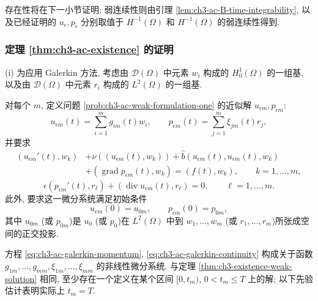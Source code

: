 存在性将在下一小节证明; 弱连续性则由引理 \ref{lem:ch3-ac-B-time-integrability}, 以及已经证明的 $u_\epsilon,p_\epsilon$ 分别取值于 $H^{-1}(\Omega)$ 和 $H^{-1}(\Omega)$ 的弱连续性得到.

\subsubsection{定理 \ref{thm:ch3-ac-existence} 的证明}
\label{subsubsec:ch3-ac-existence-proof}

\begin{Proof}
(i) 为应用 Galerkin 方法, 考虑由 $\mathcal D(\Omega)$ 中元素 $w_i$ 构成的 $H_0^1(\Omega)$ 的一组基, 以及由 $\mathcal D(\Omega)$ 中元素 $r_i$ 构成的 $L^2(\Omega)$ 的一组基.

对每个 $m$, 定义问题 \ref{prob:ch3-ac-weak-formulation-one} 的近似解 $u_{\epsilon m},p_{\epsilon m}$:
\begin{equation}
u_{\epsilon m}(t)=\sum_{i=1}^m g_{im}(t)w_i,
\qquad
p_{\epsilon m}(t)=\sum_{j=1}^m\xi_{jm}(t)r_j,
\label{eq:ch3-ac-galerkin-expansion}
\end{equation}
并要求
\begin{equation}
\begin{aligned}
(u_{\epsilon m}'(t),w_k)&+\nu((u_{\epsilon m}(t),w_k))
+\widehat b(u_{\epsilon m}(t),u_{\epsilon m}(t),w_k)\\
&+(\operatorname{grad}p_{\epsilon m}(t),w_k)
=(f(t),w_k),
\qquad k=1,\ldots,m,
\end{aligned}
\label{eq:ch3-ac-galerkin-momentum}
\end{equation}
\begin{equation}
\epsilon(p_{\epsilon m}'(t),r_\ell)
+(\operatorname{div}u_{\epsilon m}(t),r_\ell)=0,
\qquad \ell=1,\ldots,m.
\label{eq:ch3-ac-galerkin-continuity}
\end{equation}
此外, 要求这一微分系统满足初始条件
\begin{equation}
u_{\epsilon m}(0)=u_{0m},
\qquad p_{\epsilon m}(0)=p_{0m},
\label{eq:ch3-ac-galerkin-initial}
\end{equation}
其中 $u_{0m}$ (或 $p_{0m}$)是 $u_0$ (或 $p_0$)在 $L^2(\Omega)$ 中到 $w_1,\ldots,w_m$ (或 $r_1,\ldots,r_m$)所张成空间的正交投影.

方程 \eqref{eq:ch3-ac-galerkin-momentum}, \eqref{eq:ch3-ac-galerkin-continuity} 构成关于函数 $g_{1m},\ldots,g_{mm},\xi_{1m},\ldots,\xi_{mm}$ 的非线性微分系统. 与定理 \ref{thm:ch3-existence-weak-solution} 相同, 至少存在一个定义在某个区间 $[0,t_m)$, $0<t_m\leq T$ 上的解; 以下先验估计表明实际上 $t_m=T$.


\end{Proof}
